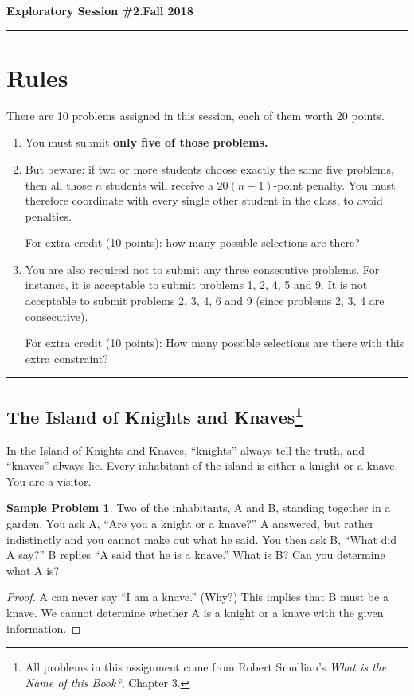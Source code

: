\documentclass[11pt]{article}
\theoremstyle{definition}
\newtheorem*{problem*}{Sample Problem}
\begin{document}
\hfill{\large\bf Exploratory Session \#2.}\hfill{\large\bf  Fall 2018}\hrule

\section*{Rules}
There are 10 problems assigned in this session, each of them worth 20 points.
\begin{enumerate}
\item You must submit \textbf{only five of those problems.}
\item But beware: if two or more students choose exactly the same five problems, then all those $n$ students will
  receive a $20(n-1)$-point penalty.  You must therefore coordinate with every single other student in the class, to
  avoid penalties.

  For extra credit (10 points): how many possible selections are there?
\item You are also required not to submit any three consecutive problems. For instance, it is acceptable to submit
  problems 1, 2, 4, 5 and 9.  It is not acceptable to submit problems 2, 3, 4, 6 and 9 (since problems 2, 3, 4 are
  consecutive).

  For extra credit (10 points): How many possible selections are there with this extra constraint? 
\end{enumerate}
\hrule

\subsection*{The Island of Knights and Knaves\footnote{All problems in this assignment come from Robert Smullian's
  \emph{What is the Name of this Book?}, Chapter 3.}}
In the Island of Knights and Knaves, ``knights'' always tell the truth, and ``knaves'' always lie.  Every inhabitant of
the island is either a knight or a knave.  You are a visitor.

\begin{problem*}
  Two of the inhabitants, A and B, standing together in a garden.  You ask A, ``Are you a knight or a knave?''  A
  answered, but rather indistinctly and you cannot make out what he said.  You then ask B, ``What did A say?''  B
  replies ``A said that he is a knave.''
  What is B? Can you determine what A is?
\end{problem*}
\begin{proof}
A can never say ``I am a knave.'' (Why?)  This implies that B must be a knave.  We cannot determine whether A is a
knight or a knave with the given information.
\end{proof}
\end{document}
